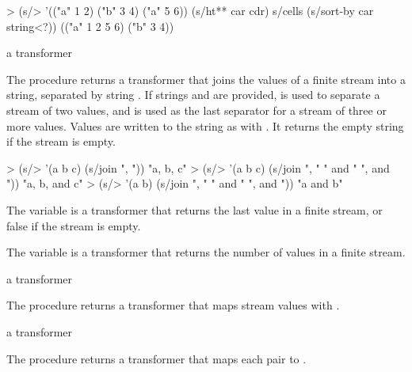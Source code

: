 \codebegin
> (s/> '(("a" 1 2) ("b" 3 4) ("a" 5 6))
    (s/ht** car cdr)
    s/cells
    (s/sort-by car string<?))
(("a" 1 2 5 6) ("b" 3 4))
\codeend

\begin{procedure}
\end{procedure}
\returns{} a transformer

The  procedure returns a transformer that joins the values of a finite stream
into a string, separated by string . If strings  and 
are provided,  is used to separate a stream of two values, and 
is used as the last separator for a stream of three or more values.  Values are written to
the string as with . It returns the empty string if the stream is empty.

\codebegin
> (s/> '(a b c) (s/join ", "))
"a, b, c"
> (s/> '(a b c) (s/join ", " " and " ", and "))
"a, b, and c"
> (s/> '(a b) (s/join ", " " and " ", and "))
"a and b"
\codeend

\begin{variable}
\end{variable}
\antipar

The  variable is a transformer that returns the last value in a finite stream,
or false if the stream is empty.

\begin{variable}
\end{variable}
\antipar

The  variable is a transformer that returns the number of values in a
finite stream.

\begin{procedure}
\end{procedure}
\returns{} a transformer

The  procedure returns a transformer that maps stream values with
.

\begin{procedure}
\end{procedure}
\returns{} a transformer

The  procedure returns a transformer that maps each pair  to .

